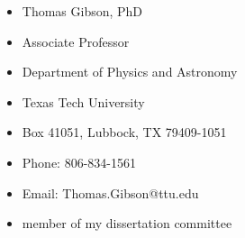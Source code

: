 \documentclass[
]{article}
\providecommand{\tightlist}{%
  \setlength{\itemsep}{0pt}\setlength{\parskip}{0pt}}
\begin{document}
\begin{itemize}
\tightlist
\item
  Thomas Gibson, PhD
\item
  Associate Professor
\item
  Department of Physics and Astronomy
\item
  Texas Tech University
\item
  Box 41051, Lubbock, TX 79409-1051
\item
  Phone: 806-834-1561
\item
  Email: Thomas.Gibson@ttu.edu
\item
  member of my dissertation committee
\end{itemize}
\end{document}
